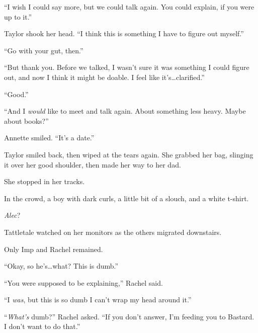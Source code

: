 ``I wish I could say more, but we could talk again.  You could explain, if you were up to it.''



Taylor shook her head.  ``I think this is something I have to figure out myself.''



``Go with your gut, then.''



``But thank you.  Before we talked, I wasn't sure it was something I could figure out, and now I think it might be doable.  I feel like it's\ldots clarified.''



``Good.''



``And I \emph{would} like to meet and talk again.  About something less heavy.  Maybe about books?''



Annette smiled.  ``It's a date.''



Taylor smiled back, then wiped at the tears again.  She grabbed her bag, slinging it over her good shoulder, then made her way to her dad.



She stopped in her tracks.



In the crowd, a boy with dark curls, a little bit of a slouch, and a white t-shirt.



\emph{Alec}?



\sectionbreak



Tattletale watched on her monitors as the others migrated downstairs.



Only Imp and Rachel remained.



``Okay, so he's\ldots what?  This is dumb.''



``You were supposed to be explaining,'' Rachel said.



``I \emph{was}, but this is so dumb I can't wrap my head around it.''



``\emph{What's} dumb?'' Rachel asked.  ``If you don't answer, I'm feeding you to Bastard.  I don't want to do that.''



